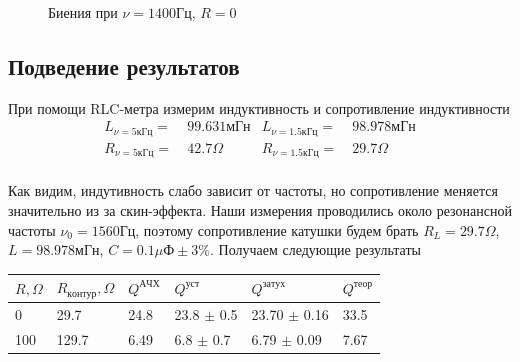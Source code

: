 \documentclass{article}
\begin{document}
\begin{figure}[h]
    \caption{Биения при $\nu=1400 Гц$, $R=0$}\label{fig:bieniya}
    \newpage
\end{figure}

\subsection{Подведение результатов}\label{results}
При помощи RLC-метра измерим индуктивность и сопротивление индуктивности
\begin{align*}
    L_{\nu=5кГц} =&\ 99.631 мГн &L_{\nu=1.5кГц} =& \ 98.978 мГн\\
    R_{\nu=5кГц} =&\ 42.7 \Omega & R_{\nu=1.5кГц} =&\  29.7 \Omega\\
\end{align*}

Как видим, индутивность слабо зависит от частоты, но сопротивление меняется значительно
из за скин-эффекта. Наши измерения проводились около резонансной частоты $\nu_0=1560Гц$,
поэтому сопротивление катушки будем брать $R_L=29.7\Omega$, $L=98.978мГн$,
$C=0.1\mu Ф \pm 3\%$. Получаем следующие результаты

\begin{table}[!h]
\begin{center}
\begin{tabular}{llllll}
$R, \Omega$ & $R_{контур}, \Omega$ & $Q^{АЧХ}$ & $Q^{уст}$ & $Q^{затух}$ & $Q^{теор}$ \\
\toprule
0   &  29.7  & 24.8  & 23.8 $\pm$ 0.5  & 23.70 $\pm$ 0.16 & 33.5   \\
100 & 129.7  & 6.49  & 6.8  $\pm$ 0.7  & 6.79  $\pm$ 0.09 & 7.67      
\end{tabular}
\end{center}
\end{table}
\end{document}
